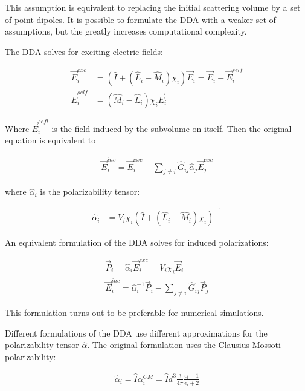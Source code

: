     This assumption is equivalent to replacing the initial scattering volume by a set of point dipoles. It is possible
    to formulate the DDA with a weaker set of assumptions, but the greatly increases computational complexity.

    The DDA solves for exciting electric fields:

    \begin{align}
        \vec{E}_i^{exc} &= \left(\hat{I} + \left(\hat{L}_i - \hat{M}_i \right)\chi_i\right)\vec{E}_i = \vec{E}_i - \vec{E}_i^{self} \\
        \vec{E}_i^{self}&= \left(\hat{M}_i - \hat{L}_i \right)\chi_i\vec{E}_i
    \end{align}

    Where $\vec{E}_i^{sefl}$ is the field induced by the subvolume on itself. Then the original equation is equivalent to

    \begin{align}
        \vec{E}_i^{inc} = \vec{E}_i^{exc} - \sum_{j\neq i}\hat{G}_{ij}\hat{\alpha}_j\vec{E}_j^{exc}
    \end{align}

    where $\hat{\alpha}_i$ is the polarizability tensor:

    \begin{align}
        \hat{\alpha}_i &= V_i\chi_i\left(\hat{I} + \left(\hat{L}_i - \hat{M}_i\right)\chi_i\right)^{-1}
    \end{align}

    An equivalent formulation of the DDA solves for induced polarizations:

    \begin{align}
        \vec{P}_i = \hat{\alpha}_i\vec{E}_i^{exc} = V_i\chi_i\vec{E}_i \\
        \vec{E}_i^{inc} = \hat{\alpha}_i^{-1}\vec{P}_i - \sum_{j \neq i} \hat{G}_{ij}\vec{P}_j
    \end{align}

    This formulation turns out to be preferable for numerical simulations.

    Different formulations of the DDA use different approximations for the polarizability tensor $\hat{\alpha}$. The original
    formulation uses the Clausius-Mossoti polarizability:

    \begin{align}
        \hat{\alpha}_i = \hat{I}\alpha_i^{CM} = \hat{I}d^3\frac{3}{4\pi}\frac{\epsilon_i -1}{\epsilon_i + 2}
    \end{align}

